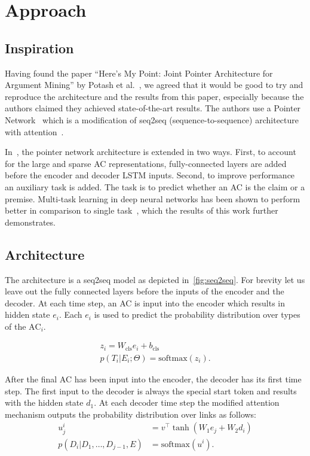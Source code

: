 \documentclass[onecolumn]{article}
\begin{document}
\section{Approach}
\subsection{Inspiration}
Having found the paper ``Here's My Point: Joint Pointer Architecture for Argument Mining'' by Potash et al.~\cite{potash2017here}, we agreed that it
would be good to try and reproduce the architecture and the results from this paper, especially because the authors claimed they achieved
state-of-the-art results. The authors use a Pointer Network~\cite{pn} which is a modification of seq2seq (sequence-to-sequence) architecture~\cite{seq2seq} with attention~\cite{attention}.

In~\cite{potash2017here}, the pointer network architecture is extended in two ways.
First, to account for the large and sparse AC representations, fully-connected layers are added before the encoder and decoder LSTM inputs.
Second, to improve performance an auxiliary task is added. The task is to predict whether an AC is the claim or a premise.
Multi-task learning in deep neural networks has been shown to perform better in comparison to single task~\cite{multi}, which the results of this work further demonstrates.

\subsection{Architecture}
The architecture is a seq2seq model as depicted in~\autoref{fig:seq2seq}.
For brevity let us leave out the fully connected layers before the inputs of the encoder and the decoder.
At each time step, an AC is input into the encoder which results in hidden state $e_i$.
Each $e_i$ is used to predict the probability distribution over types of the $\text{AC}_i$.

\begin{align*}
    z_i = W_{\text{cls}} e_i + b_{\text{cls}}\\
    p(T_i|E_i;\Theta) = \text{softmax}(z_i).
\end{align*}


After the final AC has been input into the encoder, the decoder has its first time step.
The first input to the decoder is always the special start token and results with the hidden state $d_1$.
At each decoder time step the modified attention mechanism outputs the probability distribution over links as follows:
\begin{align*}
    u_j^i &= v^\top \tanh(W_1e_j + W_2d_i)\\
    p(D_i|D_1,\dots,D_{j-1},E) &= \text{softmax}(u^i).
\end{align*}
\end{document}
